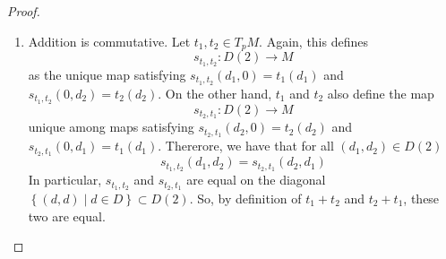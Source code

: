 \begin{proof}
  \begin{enumerate}
    \item Addition is commutative. Let \( t_1,t_2\in T_pM \). Again, this defines
      \begin{equation*}
	s_{t_1,t_2}:D(2)\to M
      \end{equation*}
      as the unique map satisfying \( s_{t_1,t_2}(d_1,0) = t_1(d_1) \) and \( s_{t_1,t_2}(0,d_2) = t_2(d_2) \). On the other hand, \( t_1 \) and \( t_2 \) also define the map
      \begin{equation*}
	s_{t_2,t_1}:D(2)\to M
      \end{equation*}
      unique among maps satisfying \( s_{t_2,t_1}(d_2,0) = t_2(d_2) \) and \( s_{t_2,t_1}(0,d_1) = t_1(d_1) \). Thererore, we have that for all \( (d_1,d_2)\in D(2) \)
      \begin{equation*}
	s_{t_1,t_2}(d_1,d_2) = s_{t_2,t_1}(d_2,d_1)
      \end{equation*}
      In particular, \( s_{t_1,t_2} \) and \( s_{t_2,t_1} \) are equal on the diagonal \( \left\{ (d,d)\mid d\in D \right\}\subset D(2) \). So, by definition of \( t_1+t_2 \) and \( t_2+t_1 \), these two are equal.


\end{enumerate}
\end{proof}
